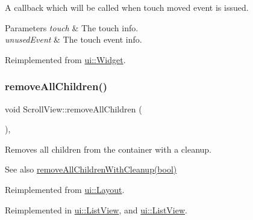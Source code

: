 A callback which will be called when touch moved event is issued. 
\begin{DoxyParams}{Parameters}
{\em touch} & The touch info. \\
\hline
{\em unused\+Event} & The touch event info. \\
\hline
\end{DoxyParams}


Reimplemented from \hyperlink{classui_1_1Widget_a16e6247b1c43273eac77623e8f129dd4}{ui\+::\+Widget}.

\mbox{\label{classui_1_1ScrollView_aaef2d3ce7b1b7d485af4a3657bea17e5}} 
\subsubsection{\texorpdfstring{remove\+All\+Children()}{removeAllChildren()}\hspace{0.1cm}{\footnotesize\ttfamily [1/2]}}
{\footnotesize\ttfamily void Scroll\+View\+::remove\+All\+Children (\begin{DoxyParamCaption}{ }\end{DoxyParamCaption})\hspace{0.3cm}{\ttfamily [override]}, {\ttfamily [virtual]}}

Removes all children from the container with a cleanup.

\begin{DoxySeeAlso}{See also}
{\ttfamily \hyperlink{classui_1_1ScrollView_ac71d0fe89be6291abbccf6a6f8f011b4}{remove\+All\+Children\+With\+Cleanup(bool)}} 
\end{DoxySeeAlso}


Reimplemented from \hyperlink{classui_1_1Layout_a6b40fa4ad7a14a1eece297e466e2c86e}{ui\+::\+Layout}.



Reimplemented in \hyperlink{classui_1_1ListView_acfa88e95692c1e9713697fbd2754379b}{ui\+::\+List\+View}, and \hyperlink{classui_1_1ListView_a7e534825fe60406ed544a254b0975489}{ui\+::\+List\+View}.

\mbox{\label{classui_1_1ScrollView_aa036ed1712c78c6ee701eb94eea55091}} 

